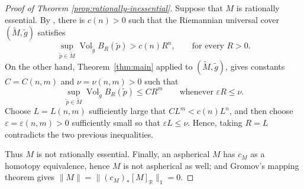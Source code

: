 \documentclass[11pt]{amsart}
\theoremstyle{definition}
\theoremstyle{remark}
\DeclareMathOperator{\Vol}{Vol}
\begin{document}
\begin{proof}[Proof of {Theorem \ref{prop:rationally-inessential}}]
Suppose that $M$ is rationally essential.  By
\cite[Theorem~1.3]{BraunSauer2021}, there is $c(n)>0$ such that the
Riemannian universal cover $(\widetilde M,\widetilde g)$ satisfies
\[
 \sup_{\widetilde p\in\widetilde M}
 \Vol_{\widetilde g}B_R(\widetilde p)>c(n)R^n,
 \qquad\text{for every }R>0.
\]
On the other hand, Theorem~\ref{thm:main} applied to
$(\widetilde M,\widetilde g)$, gives constants $C=C(n,m)$ and
$\nu=\nu(n,m)>0$ such that
\[
 \sup_{\widetilde p\in\widetilde M}
 \Vol_{\widetilde g}B_R(\widetilde p)
 \leq CR^m
 \qquad\text{whenever }\varepsilon R\leq\nu.
\]
Choose $L=L(n,m)$ sufficiently large that $CL^m<c(n)L^n$, and then
choose $\varepsilon=\varepsilon(n,m)>0$ sufficiently small so that
$\varepsilon L\leq\nu$. Hence, taking $R=L$ contradicts the two
previous inequalities.  

Thus $M$ is not rationally essential.  Finally,
an aspherical $M$ has $c_M$ as a homotopy equivalence, hence $M$ is not aspherical as well; and Gromov's
mapping theorem \cite[Section~3.1, Corollary~(B)]{GromovVolumeBounded} gives
$\lVert M\rVert=\lVert(c_M)_*[M]_{\mathbb R}\rVert_1=0$.
\end{proof}






\end{document}
